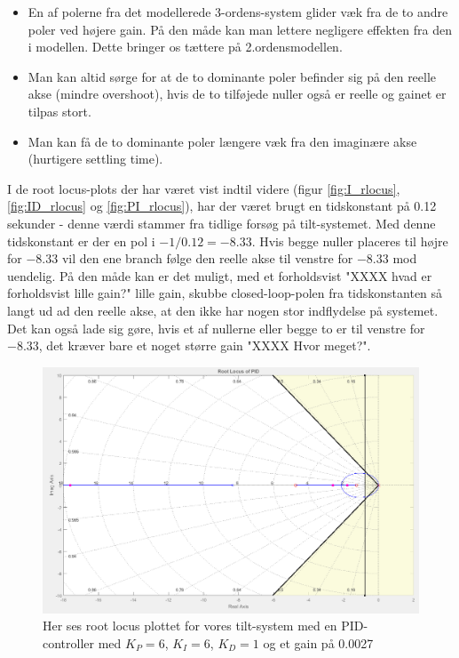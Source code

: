 \begin{itemize}[noitemsep]
	\item 	En af polerne fra det modellerede 3-ordens-system glider væk fra de to andre poler ved højere gain. På den måde kan man lettere negligere effekten fra den i modellen. Dette bringer os tættere på 2.ordensmodellen.
	\item  	Man kan altid sørge for at de to dominante poler befinder sig på den 				   	reelle akse (mindre overshoot), hvis de to tilføjede nuller også er reelle og gainet er tilpas stort. 
	\item  	Man kan få de to dominante poler længere væk fra den imaginære akse 					(hurtigere settling time).
\end{itemize}

I de root locus-plots der har været vist indtil videre (figur \ref{fig:I_rlocus}, \ref{fig:ID_rlocus} og \ref{fig:PI_rlocus}), har der været brugt en tidskonstant på 0.12 sekunder - denne værdi stammer fra tidlige forsøg på tilt-systemet. Med denne tidskonstant er der en pol i $-1/0.12=-8.33$. Hvis begge nuller placeres til højre for $-8.33$ vil den ene branch følge den reelle akse til venstre for $-8.33$ mod uendelig. På den måde kan er det muligt, med et forholdsvist "XXXX hvad er forholdsvist lille gain?" lille gain, skubbe closed-loop-polen fra tidskonstanten så langt ud ad den reelle akse, at den ikke har nogen stor indflydelse på systemet. Det kan også lade sig gøre, hvis et af nullerne eller begge to er til venstre for $-8.33$, det kræver bare et noget større gain "XXXX Hvor meget?".

\begin{figure}[!ht]
	\begin{center}
		\includegraphics[scale=0.45]{Billeder/PID_rlocus.PNG}
	\end{center}
\caption{Her ses root locus plottet for vores tilt-system med en PID-controller med $K_{P}=6$, $K_{I}=6$, $K_{D}=1$ og et gain på 0.0027}
\label{fig:PID_rlocus}
\end{figure}

